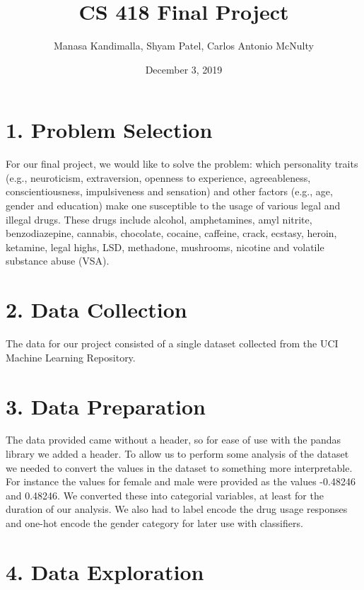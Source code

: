 \documentclass[10pt]{article}
\title{CS 418 Final Project}
\date{December 3, 2019}
\author {Manasa Kandimalla, Shyam Patel, Carlos Antonio McNulty}
\begin{document}
\maketitle

\section*{1. Problem Selection}

For our final project, we would like to solve the problem: which personality traits (e.g., neuroticism, extraversion, openness to experience, agreeableness, conscientiousness, impulsiveness and sensation) and other factors (e.g., age, gender and education) make one susceptible to the usage of various legal and illegal drugs. These drugs include alcohol, amphetamines, amyl nitrite, benzodiazepine, cannabis, chocolate, cocaine, caffeine, crack, ecstasy, heroin, ketamine, legal highs, LSD, methadone, mushrooms, nicotine and volatile substance abuse (VSA).


\section*{2. Data Collection}

The data for our project consisted of a single dataset collected from the UCI Machine Learning Repository.

\section*{3. Data Preparation}

The data provided came without a header, so for ease of use with the pandas library we added a header. To allow us to perform some analysis of the dataset we needed to convert the values in the dataset to something more interpretable. For instance the values for female and male were provided as the values -0.48246 and 0.48246. We converted these into categorial variables, at least for the duration of our analysis. We also had to label encode the drug usage responses and one-hot encode the gender category for later use with classifiers.

\section*{4. Data Exploration}
\end{document}
